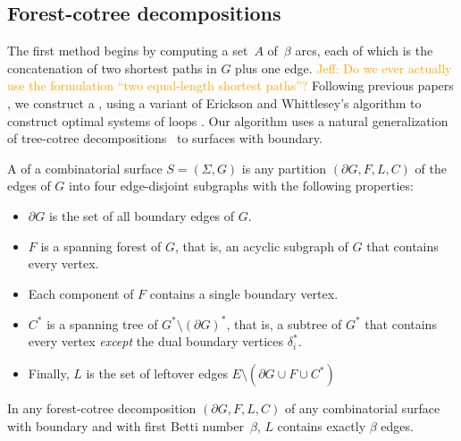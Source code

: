 \documentclass[letterpaper,review]{siamart190516}
\def\jnote#1{\textcolor{orange}{Jeff: #1}}
\begin{document}
\subsection{Forest-cotree decompositions}
\label{sec:characterizing_crossings}

The first method begins by computing a set~$A$ of~$\beta$ arcs, each of which is the concatenation of two shortest paths in $G$ plus one edge.  \jnote{Do we ever actually use the formulation “two equal-length shortest paths”?}
%
Following previous papers \cite{ccelw-scsih-08, ce-tnpcs-10, c-scgsp-10}, we construct a , using a variant of Erickson and Whittlesey's algorithm to construct optimal systems of loops \cite{ew-gohhg-05}.  Our algorithm uses a natural generalization of tree-cotree decompositions~\cite{e-dgteg-03} to surfaces with boundary.

A  of a combinatorial surface $S = (\Sigma, G)$ is any partition $(\partial\! G, F, L, C)$ of the edges of $G$ into four edge-disjoint subgraphs with the following properties:
\begin{itemize}\itemsep0pt
\item $\partial\! G$ is the set of all boundary edges of $G$.
\item $F$ is a spanning forest of $G$, that is, an acyclic subgraph of $G$ that contains every vertex.
\item Each component of $F$ contains a single boundary vertex.
\item $C^*$ is a spanning tree of $G^*\setminus (\partial G)^*$, that is, a subtree of $G^*$ that contains every vertex \emph{except} the dual boundary vertices $\delta_i^*$.
\item Finally, $L$ is the set of leftover edges $E \setminus (\partial\!G \cup F \cup C^*)$
\end{itemize}

\begin{lemma}
\label{lem:L_edges}
In any forest-cotree decomposition $(\partial\! G, F, L, C)$ of any combinatorial surface with boundary and with first Betti number~$\beta$,  $L$ contains exactly $\beta$ edges.
\end{lemma}
\end{document}
